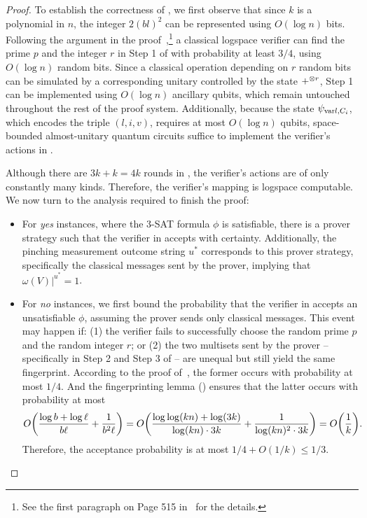 \documentclass[10pt,a4paper]{article}
\numberwithin{equation}{section}
\numberwithin{figure}{section}
\newcommand{\threeSAT}{\textnormal{\textsc{3-SAT}}\xspace}
\DeclarePairedDelimiter\rbra{\lparen}{\rparen}
\let\ket\relax\DeclarePairedDelimiter\ket{\lvert}{\rangle}
\newcommand{\var}{\mathrm{var}}
\begin{document}
\begin{proof}
    \vspace{1em}
    To establish the correctness of , 
    we first observe that since $k$ is a polynomial in $n$, the integer $2(bl)^2$ can be represented using $O(\log n)$ bits. 
    Following the argument in the proof~\cite[Lemma 2]{CL95},\footnote{See the first paragraph on Page 515 in~\cite{CL95} for the details.} a classical logspace verifier can find the prime $p$ and the integer $r$ in Step 1 of  with probability at least $3/4$, using $O(\log n)$ random bits. 
    Since a classical operation depending on $r$ random bits can be simulated by a corresponding unitary controlled by the state $\ket{+}^{\otimes r}$, Step 1 can be implemented using $O(\log{n})$ ancillary qubits, which remain untouched throughout the rest of the proof system. Additionally, because the state $\ket{\psi_{\var{l},C_i}}$, which encodes the triple $(l,i,v)$, requires at most $O(\log n)$ qubits, space-bounded almost-unitary quantum circuits suffice to implement the verifier's actions in .
    
    Although there are $3k+k=4k$ rounds in , the verifier's actions are of only constantly many kinds. Therefore, the verifier's mapping is logspace computable. We now turn to the analysis required to finish the proof:
    \begin{itemize}
        \item For \textit{yes} instances, where the \threeSAT{} formula $\phi$ is satisfiable, there is a prover strategy such that the verifier in  accepts with certainty. Additionally, the pinching measurement outcome string $u^*$ corresponds to this prover strategy, specifically the classical messages sent by the prover, implying that $\omega(V)|^{u^*} = 1$. 
        \item For \textit{no} instances, we first bound the probability that the verifier in  accepts an unsatisfiable $\phi$, assuming the prover sends only classical messages. This event may happen if: (1) the verifier fails to successfully choose the random prime $p$ and the random integer $r$; or (2) the two multisets sent by the prover -- specifically in Step 2 and Step 3 of  -- are unequal but still yield the same fingerprint. According to the proof of~\cite[Lemma 2]{CL95}, the former occurs with probability at most $1/4$. And the fingerprinting lemma () ensures that the latter occurs with probability at most 
        \[O\rbra*{ \frac{\log b + \log \ell}{b\ell}+ \frac{1}{b^2\ell} } = O\rbra*{ \frac{\log\log(kn) + \log(3k)}{\log(kn) \cdot 3k} + \frac{1}{\log(kn)^2 \cdot 3k}} = O\rbra*{\frac{1}{k}}.\]
        Therefore, the acceptance probability is at most $1/4 + O(1/k) \leq 1/3$. 


\end{itemize}
\end{proof}
\end{document}
